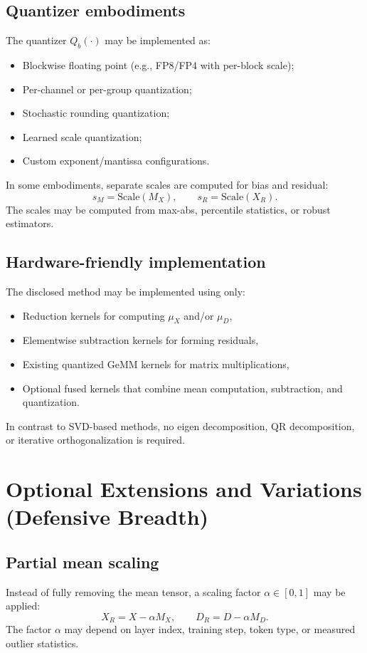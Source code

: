 \documentclass[11pt]{article}
\begin{document}
\subsection{Quantizer embodiments}
The quantizer $Q_b(\cdot)$ may be implemented as:
\begin{itemize}[leftmargin=1.2em]
\item Blockwise floating point (e.g., FP8/FP4 with per-block scale);
\item Per-channel or per-group quantization;
\item Stochastic rounding quantization;
\item Learned scale quantization;
\item Custom exponent/mantissa configurations.
\end{itemize}
In some embodiments, separate scales are computed for bias and residual:
\[
s_M = \mathrm{Scale}(M_X),\qquad s_R=\mathrm{Scale}(X_R).
\]
The scales may be computed from max-abs, percentile statistics, or robust estimators.

\subsection{Hardware-friendly implementation}
The disclosed method may be implemented using only:
\begin{itemize}[leftmargin=1.2em]
\item Reduction kernels for computing $\mu_X$ and/or $\mu_D$,
\item Elementwise subtraction kernels for forming residuals,
\item Existing quantized GeMM kernels for matrix multiplications,
\item Optional fused kernels that combine mean computation, subtraction, and quantization.
\end{itemize}
In contrast to SVD-based methods, no eigen decomposition, QR decomposition, or iterative orthogonalization is required.

\section{Optional Extensions and Variations (Defensive Breadth)}

\subsection{Partial mean scaling}
Instead of fully removing the mean tensor, a scaling factor $\alpha\in[0,1]$ may be applied:
\[
X_R = X - \alpha M_X,\qquad D_R = D - \alpha M_D.
\]
The factor $\alpha$ may depend on layer index, training step, token type, or measured outlier statistics.
\end{document}
